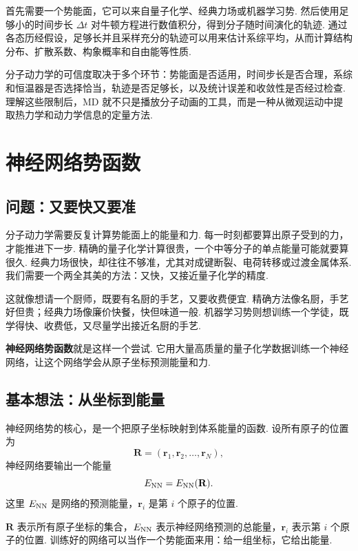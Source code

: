 \documentclass[UTF8,11pt,a4paper,openany]{ctexbook}
\newcommand{\term}[1]{\textbf{#1}}
\begin{document}
首先需要一个势能面，它可以来自量子化学、经典力场或机器学习势. 然后使用足够小的时间步长 $\Delta t$ 对牛顿方程进行数值积分，得到分子随时间演化的轨迹. 通过各态历经假设，足够长并且采样充分的轨迹可以用来估计系综平均，从而计算结构分布、扩散系数、构象概率和自由能等性质. 

分子动力学的可信度取决于多个环节：势能面是否适用，时间步长是否合理，系综和恒温器是否选择恰当，轨迹是否足够长，以及统计误差和收敛性是否经过检查. 理解这些限制后，MD 就不只是播放分子动画的工具，而是一种从微观运动中提取热力学和动力学信息的定量方法. 
\chapter{神经网络势函数}

\section{问题：又要快又要准}

分子动力学需要反复计算势能面上的能量和力. 每一时刻都要算出原子受到的力，才能推进下一步. 精确的量子化学计算很贵，一个中等分子的单点能量可能就要算很久. 经典力场很快，却往往不够准，尤其对成键断裂、电荷转移或过渡金属体系. 我们需要一个两全其美的方法：又快，又接近量子化学的精度. 

\begin{analogybox}
这就像想请一个厨师，既要有名厨的手艺，又要收费便宜. 精确方法像名厨，手艺好但贵；经典力场像廉价快餐，快但味道一般. 机器学习势则想训练一个学徒，既学得快、收费低，又尽量学出接近名厨的手艺. 
\end{analogybox}

\term{神经网络势函数}就是这样一个尝试. 它用大量高质量的量子化学数据训练一个神经网络，让这个网络学会从原子坐标预测能量和力. 

\section{基本想法：从坐标到能量}

神经网络势的核心，是一个把原子坐标映射到体系能量的函数. 设所有原子的位置为
\[
\mathbf R=(\mathbf r_1,\mathbf r_2,\ldots,\mathbf r_N),
\]
神经网络要输出一个能量
\[
E_{\rm NN}=E_{\rm NN}(\mathbf R).
\]
这里 $E_{\rm NN}$ 是网络的预测能量，$\mathbf r_i$ 是第 $i$ 个原子的位置. 

\begin{notationbox}
$\mathbf R$ 表示所有原子坐标的集合，$E_{\rm NN}$ 表示神经网络预测的总能量，$\mathbf r_i$ 表示第 $i$ 个原子的位置. 训练好的网络可以当作一个势能面来用：给一组坐标，它给出能量. 
\end{notationbox}
\end{document}
